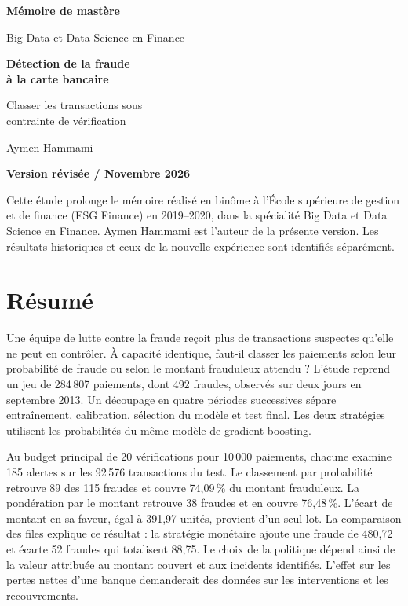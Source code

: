 \documentclass[11pt,a4paper]{article}
\newcommand{\nomAuteur}{Aymen Hammami}
\begin{document}
\hypersetup{pageanchor=false}
\begin{titlepage}
\thispagestyle{empty}
\vspace*{5mm}
{\large\sffamily\bfseries\color{pin} Mémoire de mastère}\par
{\large\sffamily Big Data et Data Science en Finance}\par
\vspace*{27mm}
{\fontsize{32}{38}\selectfont\bfseries\color{encre}Détection de la fraude\\à la carte bancaire\par}
\vspace{8mm}
{\fontsize{19}{25}\selectfont\color{encre}Classer les transactions sous\\contrainte de vérification\par}
\vspace{15mm}
{\Large\nomAuteur\par}
\vfill
{\large\sffamily\bfseries\color{pin} Version révisée \enspace / \enspace Novembre 2026}\par
\vspace{2mm}
\begin{minipage}{.91\linewidth}\small
Cette étude prolonge le mémoire réalisé en binôme à l'École supérieure de gestion et de finance (ESG Finance) en 2019--2020, dans la spécialité Big Data et Data Science en Finance. Aymen Hammami est l'auteur de la présente version. Les résultats historiques et ceux de la nouvelle expérience sont identifiés séparément.
\end{minipage}
\end{titlepage}
\hypersetup{pageanchor=true}
\section*{Résumé}
Une équipe de lutte contre la fraude reçoit plus de transactions suspectes qu'elle ne peut en contrôler. À capacité identique, faut-il classer les paiements selon leur probabilité de fraude ou selon le montant frauduleux attendu ? L'étude reprend un jeu de 284\,807 paiements, dont 492 fraudes, observés sur deux jours en septembre 2013. Un découpage en quatre périodes successives sépare entraînement, calibration, sélection du modèle et test final. Les deux stratégies utilisent les probabilités du même modèle de gradient boosting.

Au budget principal de 20 vérifications pour 10\,000 paiements, chacune examine 185 alertes sur les 92\,576 transactions du test. Le classement par probabilité retrouve 89 des 115 fraudes et couvre 74,09\,\% du montant frauduleux. La pondération par le montant retrouve 38 fraudes et en couvre 76,48\,\%. L'écart de montant en sa faveur, égal à 391,97 unités, provient d'un seul lot. La comparaison des files explique ce résultat : la stratégie monétaire ajoute une fraude de 480,72 et écarte 52 fraudes qui totalisent 88,75. Le choix de la politique dépend ainsi de la valeur attribuée au montant couvert et aux incidents identifiés. L'effet sur les pertes nettes d'une banque demanderait des données sur les interventions et les recouvrements.
\end{document}
